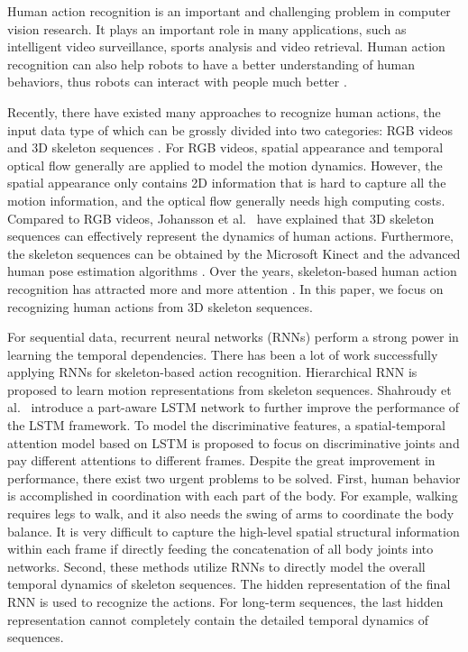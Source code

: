 \documentclass[runningheads]{llncs}
\begin{document}
Human action recognition is an important and challenging problem in computer vision research. It plays an important role in many applications, such as intelligent video surveillance, sports analysis and video retrieval. Human action recognition can also help robots to have a better understanding of human behaviors, thus robots can interact with people much better \cite{Poppe2010survey,Weinland2011survey,Aggarwal2011Human}.

Recently, there have existed many approaches to recognize human actions, the input data type of which can be grossly divided into two categories: RGB videos \cite{Simonyan2014Two-stream} and 3D skeleton sequences \cite{Du2015Hierarchical}. For RGB videos, spatial appearance and temporal optical flow generally are applied to model the motion dynamics. However, the spatial appearance only contains 2D information that is hard to capture all the motion information, and the optical flow generally needs high computing costs. Compared to RGB videos, Johansson et al.~\cite{johansson1973visual} have explained that 3D skeleton sequences can effectively represent the dynamics of human actions. Furthermore, the skeleton sequences can be obtained by the Microsoft Kinect \cite{zhang2012microsoft} and the advanced human pose estimation algorithms \cite{cao2017realtime}. Over the years, skeleton-based human action recognition has attracted more and more attention \cite{aggarwal2014human,Du2015Hierarchical,Song2017Attention}. In this paper, we focus on recognizing human actions from 3D skeleton sequences.

For sequential data, recurrent neural networks (RNNs) perform a strong power in learning the temporal dependencies. There has been a lot of work successfully applying RNNs for skeleton-based action recognition. Hierarchical RNN \cite{Du2015Hierarchical} is proposed to learn motion representations from skeleton sequences. Shahroudy et al.~\cite{Shahroudy2016NTU} introduce a part-aware LSTM network to further improve the performance of the LSTM framework. To model the discriminative features, a spatial-temporal attention model \cite{Song2017Attention} based on LSTM is proposed to focus on discriminative joints and pay different attentions to different frames. Despite the great improvement in performance, there exist two urgent problems to be solved. First, human behavior is accomplished in coordination with each part of the body. For example, walking requires legs to walk, and it also needs the swing of arms to coordinate the body balance.  It is very difficult to capture the high-level spatial structural information within each frame if directly feeding the concatenation of all body joints into networks. Second, these methods utilize RNNs to directly model the overall temporal dynamics of skeleton sequences. The hidden representation of the final RNN is used to recognize the actions. For long-term sequences, the last hidden representation cannot completely contain the detailed temporal dynamics of sequences.
\end{document}
